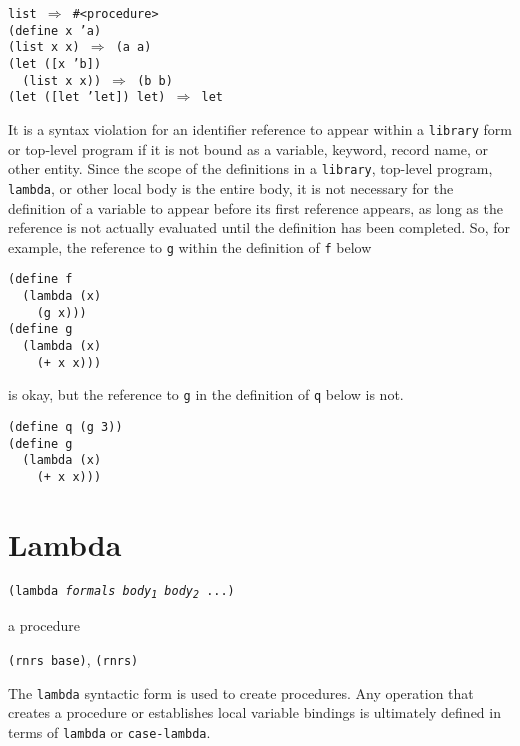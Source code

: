 \begin{alltt}
list \(\Rightarrow\) \#{}\textless{}procedure\textgreater{}
(define x 'a)
(list x x) \(\Rightarrow\) (a a)
(let ([x 'b])
  (list x x)) \(\Rightarrow\) (b b)
(let ([let 'let]) let) \(\Rightarrow\) let
\end{alltt}


It is a syntax violation for an identifier reference to appear within a
\texttt{library} form or top-level program if it is not bound as a variable,
keyword, record name, or other entity.
Since the scope of the definitions in a \texttt{library}, top-level
program, \texttt{lambda}, or other local body is the entire body, it
is not necessary for the definition of a variable to appear before
its first reference appears, as long as the reference is not actually
evaluated until the definition has been completed.
So, for example, the reference to \texttt{g} within the definition of
\texttt{f} below


\begin{alltt}
(define f
  (lambda (x)
    (g x)))
(define g
  (lambda (x)
    (+ x x)))
\end{alltt}


is okay, but the reference to \texttt{g} in the definition of
\texttt{q} below is not.


\begin{alltt}
(define q (g 3))
(define g
  (lambda (x)
    (+ x x)))
\end{alltt}

\section{\label{binding_g90}\label{binding_h2}Lambda\label{binding_SECTLAMBDA}}


\begin{description}

\label{binding_s3}\item[syntax] \texttt{(lambda \textit{formals} \textit{body\textsubscript{1}} \textit{body\textsubscript{2}} ...)}



\item[returns] a procedure


\item[libraries] \texttt{(rnrs base)}, \texttt{(rnrs)}
\end{description}


The \texttt{lambda} syntactic form is used to create \label{binding_s4}procedures.
Any operation that creates a procedure or establishes local variable
bindings is ultimately defined in terms of \texttt{lambda} or
\texttt{case-lambda}.


